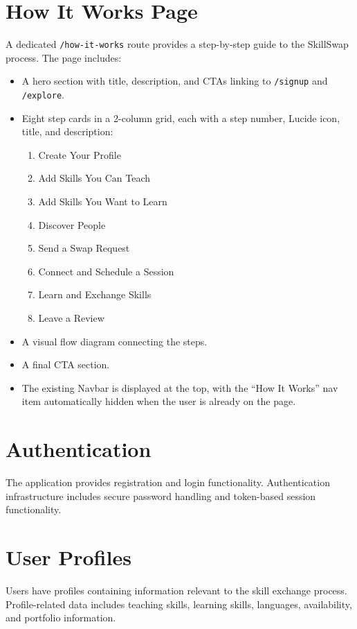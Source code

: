 \documentclass[12pt,a4paper]{report}
\begin{document}
\section{How It Works Page}
A dedicated \texttt{/how-it-works} route provides a step-by-step guide to the
SkillSwap process.  The page includes:

\begin{itemize}[noitemsep]
  \item A hero section with title, description, and CTAs linking to
        \texttt{/signup} and \texttt{/explore}.
  \item Eight step cards in a 2-column grid, each with a step number, Lucide
        icon, title, and description:
  \begin{enumerate}[noitemsep]
    \item Create Your Profile
    \item Add Skills You Can Teach
    \item Add Skills You Want to Learn
    \item Discover People
    \item Send a Swap Request
    \item Connect and Schedule a Session
    \item Learn and Exchange Skills
    \item Leave a Review
  \end{enumerate}
  \item A visual flow diagram connecting the steps.
  \item A final CTA section.
  \item The existing Navbar is displayed at the top, with the ``How It Works''
        nav item automatically hidden when the user is already on the page.
\end{itemize}

\section{Authentication}
The application provides registration and login functionality.
Authentication infrastructure includes secure password handling and token-based
session functionality.

\section{User Profiles}
Users have profiles containing information relevant to the skill exchange
process.  Profile-related data includes teaching skills, learning skills,
languages, availability, and portfolio information.
\end{document}
